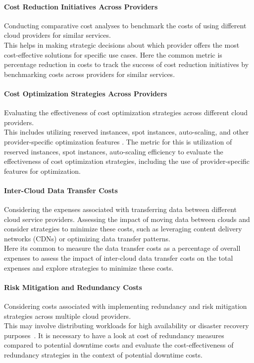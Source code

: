 \paragraph{Cost Reduction Initiatives Across Providers}

Conducting comparative cost analyses to benchmark the costs of using different cloud providers 
for similar services\cite{simarroDynamicPlacementVirtual2011}.\\ 
This helps in making strategic decisions about which provider 
offers the most cost-effective solutions for specific use cases.
Here the common metric is percentage reduction in costs to
track the success of cost reduction initiatives by benchmarking costs 
across providers for similar services.

\paragraph{Cost Optimization Strategies Across Providers}

Evaluating the effectiveness of cost optimization strategies across different cloud providers. \\
This includes utilizing reserved instances, spot instances, auto-scaling, 
and other provider-specific optimization features \cite{quReliableCostefficientAutoscaling2016} \cite{AmazonEC2Secure}.
The metric for this is utilization of reserved instances, spot instances, auto-scaling efficiency
to evaluate the effectiveness of cost optimization strategies, including the 
use of provider-specific features for optimization.


\paragraph{Inter-Cloud Data Transfer Costs}

Considering the expenses associated with transferring data between different cloud service 
providers.
Assessing the impact of moving data between clouds and consider strategies to minimize these costs, 
such as leveraging content delivery networks (CDNs) or optimizing data transfer patterns\cite{celestiHybridMultiCloudStorage2019}.\\
Here its common to measure the data transfer costs as a percentage of overall expenses
to assess the impact of inter-cloud data transfer costs on the total expenses 
and explore strategies to minimize these costs.


\paragraph{Risk Mitigation and Redundancy Costs}
Considering costs associated with implementing redundancy and 
risk mitigation strategies across multiple cloud providers. \\
This may involve distributing workloads for high availability or disaster recovery purposes \cite{santosAnalyzingITSubsystem2017}.
It is necessary to have a look at cost of redundancy measures compared to potential downtime costs
and evaluate the cost-effectiveness of redundancy strategies in the context 
of potential downtime costs.

